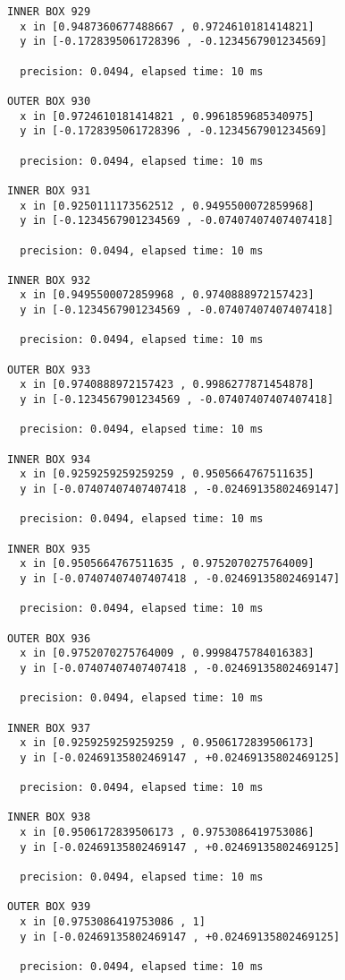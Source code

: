 \begin{verbatim}
INNER BOX 929
  x in [0.9487360677488667 , 0.9724610181414821]
  y in [-0.1728395061728396 , -0.1234567901234569]

  precision: 0.0494, elapsed time: 10 ms

OUTER BOX 930
  x in [0.9724610181414821 , 0.9961859685340975]
  y in [-0.1728395061728396 , -0.1234567901234569]

  precision: 0.0494, elapsed time: 10 ms

INNER BOX 931
  x in [0.9250111173562512 , 0.9495500072859968]
  y in [-0.1234567901234569 , -0.07407407407407418]

  precision: 0.0494, elapsed time: 10 ms

INNER BOX 932
  x in [0.9495500072859968 , 0.9740888972157423]
  y in [-0.1234567901234569 , -0.07407407407407418]

  precision: 0.0494, elapsed time: 10 ms

OUTER BOX 933
  x in [0.9740888972157423 , 0.9986277871454878]
  y in [-0.1234567901234569 , -0.07407407407407418]

  precision: 0.0494, elapsed time: 10 ms

INNER BOX 934
  x in [0.9259259259259259 , 0.9505664767511635]
  y in [-0.07407407407407418 , -0.02469135802469147]

  precision: 0.0494, elapsed time: 10 ms

INNER BOX 935
  x in [0.9505664767511635 , 0.9752070275764009]
  y in [-0.07407407407407418 , -0.02469135802469147]

  precision: 0.0494, elapsed time: 10 ms

OUTER BOX 936
  x in [0.9752070275764009 , 0.9998475784016383]
  y in [-0.07407407407407418 , -0.02469135802469147]

  precision: 0.0494, elapsed time: 10 ms

INNER BOX 937
  x in [0.9259259259259259 , 0.9506172839506173]
  y in [-0.02469135802469147 , +0.02469135802469125]

  precision: 0.0494, elapsed time: 10 ms

INNER BOX 938
  x in [0.9506172839506173 , 0.9753086419753086]
  y in [-0.02469135802469147 , +0.02469135802469125]

  precision: 0.0494, elapsed time: 10 ms

OUTER BOX 939
  x in [0.9753086419753086 , 1]
  y in [-0.02469135802469147 , +0.02469135802469125]

  precision: 0.0494, elapsed time: 10 ms


\end{verbatim}
